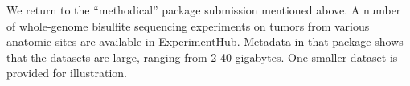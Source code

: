 We return to the ``methodical'' package
submission mentioned above.
A number of whole-genome bisulfite sequencing experiments on
tumors from various anatomic sites are available
in ExperimentHub.
Metadata in that package shows that the datasets
are large, ranging from 2-40 gigabytes. One smaller
dataset is provided for illustration.


